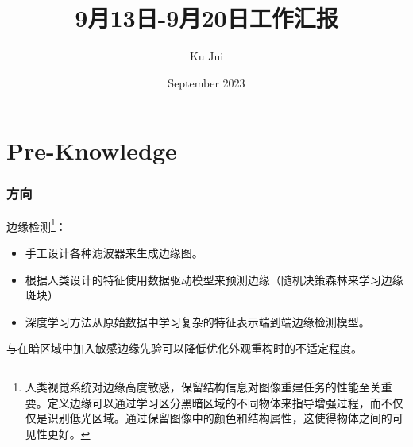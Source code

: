 \documentclass[a4paper, 10pt]{article}
\begin{document}
	
	
	\title{\songti {}9月13日-9月20日工作汇报}
	\author{\textrm{Ku Jui}}
	\date{\textrm{September 2023}}
	\maketitle
	
	\renewcommand{\figurename}{Figure} %
	\renewcommand{\contentsname}{Contents}
	\renewcommand{\tablename}{Table}
	\tableofcontents  %
	
	\part{Pre-Knowledge}	
	
	\section{方向}
	
		边缘检测\footnote{人类视觉系统对边缘高度敏感，保留结构信息对图像重建任务的性能至关重要。定义边缘可以通过学习区分黑暗区域的不同物体来指导增强过程，而不仅仅是识别低光区域。通过保留图像中的颜色和结构属性，这使得物体之间的可见性更好。}：
		
		\begin{itemize}
			\item[(1)] 
			手工设计各种滤波器来生成边缘图。
			
			\item[(2)]
			根据人类设计的特征使用数据驱动模型来预测边缘（随机决策森林来学习边缘斑块）
			
			\item[(3)]
			深度学习方法从原始数据中学习复杂的特征表示端到端边缘检测模型。
		\end{itemize}	
		
		\cite{rana2021edge}与\cite{zhu2020eemefn}在暗区域中加入敏感边缘先验可以降低优化外观重构时的不适定程度。
\end{document}
